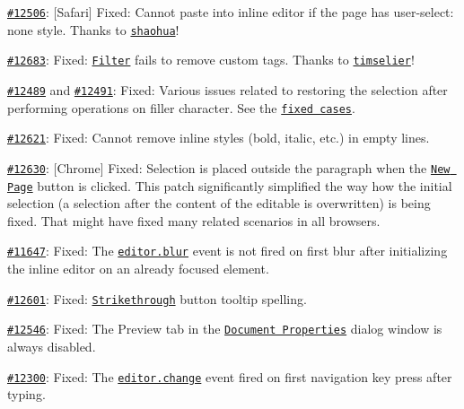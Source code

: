 \begin{DoxyItemize}
\item \href{http://dev.ckeditor.com/ticket/12506}{\tt \#12506}\+: \mbox{[}Safari\mbox{]} Fixed\+: Cannot paste into inline editor if the page has {\ttfamily user-\/select\+: none} style. Thanks to \href{https://github.com/shaohua}{\tt shaohua}!
\item \href{http://dev.ckeditor.com/ticket/12683}{\tt \#12683}\+: Fixed\+: \href{http://docs.ckeditor.com/#!/guide/dev_acf}{\tt Filter} fails to remove custom tags. Thanks to \href{https://github.com/timselier}{\tt timselier}!
\item \href{http://dev.ckeditor.com/ticket/12489}{\tt \#12489} and \href{http://dev.ckeditor.com/ticket/12491}{\tt \#12491}\+: Fixed\+: Various issues related to restoring the selection after performing operations on filler character. See the \href{http://dev.ckeditor.com/ticket/12491#comment:4}{\tt fixed cases}.
\item \href{http://dev.ckeditor.com/ticket/12621}{\tt \#12621}\+: Fixed\+: Cannot remove inline styles (bold, italic, etc.) in empty lines.
\item \href{http://dev.ckeditor.com/ticket/12630}{\tt \#12630}\+: \mbox{[}Chrome\mbox{]} Fixed\+: Selection is placed outside the paragraph when the \href{http://ckeditor.com/addon/newpage}{\tt New Page} button is clicked. This patch significantly simplified the way how the initial selection (a selection after the content of the editable is overwritten) is being fixed. That might have fixed many related scenarios in all browsers.
\item \href{http://dev.ckeditor.com/ticket/11647}{\tt \#11647}\+: Fixed\+: The \href{http://docs.ckeditor.com/#!/api/CKEDITOR.editor-event-blur}{\tt {\ttfamily editor.\+blur}} event is not fired on first blur after initializing the inline editor on an already focused element.
\item \href{http://dev.ckeditor.com/ticket/12601}{\tt \#12601}\+: Fixed\+: \href{http://ckeditor.com/addon/basicstyles}{\tt Strikethrough} button tooltip spelling.
\item \href{http://dev.ckeditor.com/ticket/12546}{\tt \#12546}\+: Fixed\+: The Preview tab in the \href{http://ckeditor.com/addon/docprops}{\tt Document Properties} dialog window is always disabled.
\item \href{http://dev.ckeditor.com/ticket/12300}{\tt \#12300}\+: Fixed\+: The \href{http://docs.ckeditor.com/#!/api/CKEDITOR.editor-event-change}{\tt {\ttfamily editor.\+change}} event fired on first navigation key press after typing.

\end{DoxyItemize}
